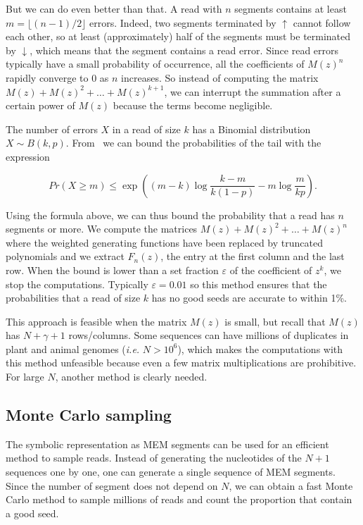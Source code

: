 \documentclass{article}
\begin{document}
But we can do even better than that. A read with $n$ segments contains at
least $m=\lfloor{(n-1)/2}\rfloor$ errors. Indeed, two segments terminated
by $\uparrow$ cannot follow each other, so at least (approximately) half
of the segments must be terminated by $\downarrow$, which means that the
segment contains a read error. Since read errors typically have a small
probability of occurrence, all the coefficients of $M(z)^n$ rapidly
converge to $0$ as $n$ increases. So instead of computing the matrix $M(z)
+ M(z)^2 + \ldots + M(z)^{k+1}$, we can interrupt the summation after a
certain power of $M(z)$ because the terms become negligible.

The number of errors $X$ in a read of size $k$ has a Binomial
distribution $X \sim B(k,p)$. From~\cite{arratia1989tutorial} we can bound
the probabilities of the tail with the expression

\begin{equation}
\label{eq:bound}
Pr(X \geq m) \leq \exp \left( (m-k)\log \frac{k-m}{k(1-p)} -m\log
\frac{m}{kp} \right).
\end{equation}

Using the formula above, we can thus bound the probability that a read has
$n$ segments or more. We compute the matrices $M(z) + M(z)^2 + \ldots
+M(z)^n$ where the weighted generating functions have been replaced by
truncated polynomials and we extract $F_n(z)$, the entry at the first
column and the last row. When the bound is lower than a set fraction
$\varepsilon$ of the coefficient of $z^k$, we stop the computations.
Typically $\varepsilon = 0.01$ so this method ensures that the
probabilities that a read of size $k$ has no good seeds are accurate to
within 1\%.

This approach is feasible when the matrix $M(z)$ is small, but recall that
$M(z)$ has $N+\gamma+1$ rows/columns. Some sequences can have millions of
duplicates in plant and animal genomes (\textit{i.e.} $N > 10^6$), which
makes the computations with this method unfeasible because even a few
matrix multiplications are prohibitive. For large $N$, another method is
clearly needed.


\subsection{Monte Carlo sampling}
\label{sec:montecarlo}

The symbolic representation as MEM segments can be used for an efficient
method to sample reads. Instead of generating the nucleotides of the $N+1$
sequences one by one, one can generate a single sequence of MEM segments.
Since the number of segment does not depend on $N$, we can obtain a fast
Monte Carlo method to sample millions of reads and count the proportion
that contain a good seed.
\end{document}
